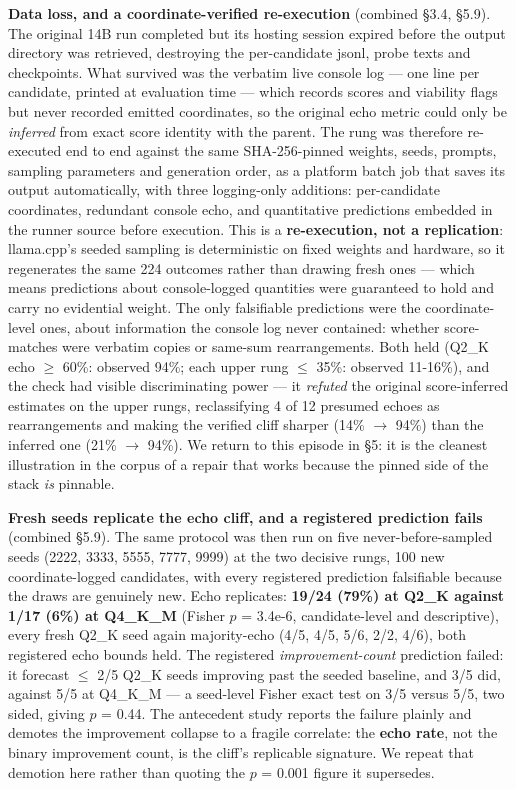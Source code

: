\documentclass[11pt]{article}
\begin{document}
\textbf{Data loss, and a coordinate-verified re-execution} (combined \S3.4, \S5.9). The original
14B run completed but its hosting session expired before the output directory was
retrieved, destroying the per-candidate jsonl, probe texts and checkpoints. What survived
was the verbatim live console log --- one line per candidate, printed at evaluation time ---
which records scores and viability flags but never recorded emitted coordinates, so the
original echo metric could only be \emph{inferred} from exact score identity with the parent.
The rung was therefore re-executed end to end against the same SHA-256-pinned weights,
seeds, prompts, sampling parameters and generation order, as a platform batch job that
saves its output automatically, with three logging-only additions: per-candidate
coordinates, redundant console echo, and quantitative predictions embedded in the runner
source before execution. This is a \textbf{re-execution, not a replication}: llama.cpp's seeded
sampling is deterministic on fixed weights and hardware, so it regenerates the same 224
outcomes rather than drawing fresh ones --- which means predictions about console-logged
quantities were guaranteed to hold and carry no evidential weight. The only falsifiable
predictions were the coordinate-level ones, about information the console log never
contained: whether score-matches were verbatim copies or same-sum rearrangements. Both
held (Q2\_K echo $\ge$ 60\%: observed 94\%; each upper rung $\le$ 35\%: observed 11-16\%), and the
check had visible discriminating power --- it \emph{refuted} the original score-inferred
estimates on the upper rungs, reclassifying 4 of 12 presumed echoes as rearrangements and
making the verified cliff sharper (14\% $\rightarrow$ 94\%) than the inferred one (21\% $\rightarrow$ 94\%). We
return to this episode in \S5: it is the cleanest illustration in the corpus of a repair
that works because the pinned side of the stack \emph{is} pinnable.

\textbf{Fresh seeds replicate the echo cliff, and a registered prediction fails} (combined
\S5.9). The same protocol was then run on five never-before-sampled seeds (2222, 3333,
5555, 7777, 9999) at the two decisive rungs, 100 new coordinate-logged candidates, with
every registered prediction falsifiable because the draws are genuinely new. Echo
replicates: \textbf{19/24 (79\%) at Q2\_K against 1/17 (6\%) at Q4\_K\_M} (Fisher $p$ = 3.4e-6,
candidate-level and descriptive), every fresh Q2\_K seed again majority-echo (4/5, 4/5,
5/6, 2/2, 4/6), both registered echo bounds held. The registered \emph{improvement-count}
prediction failed: it forecast $\le$ 2/5 Q2\_K seeds improving past the seeded baseline, and
3/5 did, against 5/5 at Q4\_K\_M --- a seed-level Fisher exact test on 3/5 versus 5/5, two
sided, giving $p$ = 0.44. The antecedent study reports the failure plainly and demotes the
improvement collapse to a fragile correlate: the \textbf{echo rate}, not the binary improvement
count, is the cliff's replicable signature. We repeat that demotion here rather than
quoting the $p$ = 0.001 figure it supersedes.
\end{document}
